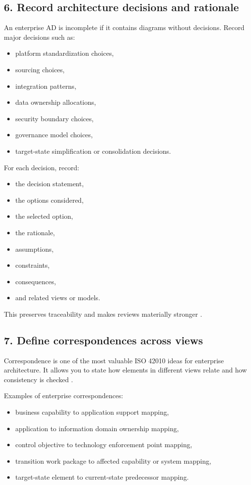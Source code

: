 \documentclass[11pt]{article}
\begin{document}
\subsection*{6. Record architecture decisions and rationale}
An enterprise AD is incomplete if it contains diagrams without decisions. Record major decisions such as:
\begin{itemize}
    \item platform standardization choices,
    \item sourcing choices,
    \item integration patterns,
    \item data ownership allocations,
    \item security boundary choices,
    \item governance model choices,
    \item target-state simplification or consolidation decisions.
\end{itemize}

For each decision, record:
\begin{itemize}
    \item the decision statement,
    \item the options considered,
    \item the selected option,
    \item the rationale,
    \item assumptions,
    \item constraints,
    \item consequences,
    \item and related views or models.
\end{itemize}

This preserves traceability and makes reviews materially stronger \cite{cm42010}.

\subsection*{7. Define correspondences across views}
Correspondence is one of the most valuable ISO 42010 ideas for enterprise architecture. It allows you to state how elements in different views relate and how consistency is checked \cite{cm42010}.

Examples of enterprise correspondences:
\begin{itemize}
    \item business capability to application support mapping,
    \item application to information domain ownership mapping,
    \item control objective to technology enforcement point mapping,
    \item transition work package to affected capability or system mapping,
    \item target-state element to current-state predecessor mapping.
\end{itemize}
\end{document}

